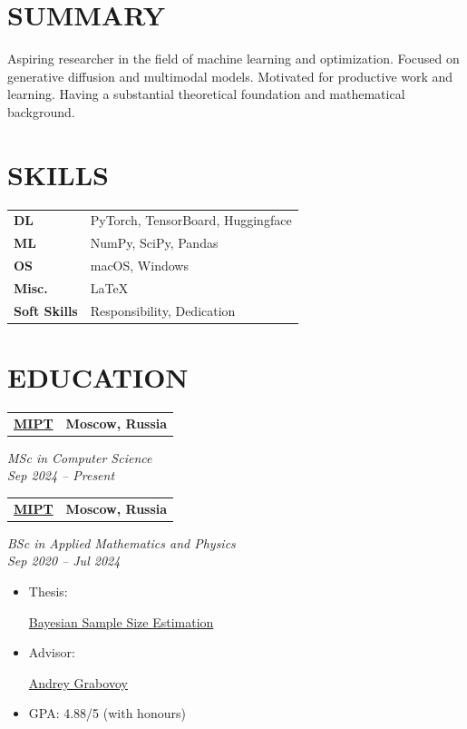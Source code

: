 \documentclass[11pt,a4paper]{moderncv}
\newcommand*{\educationentry}[4][0.5mm]{
    \begin{tabularx}{\textwidth}{LR}
        {\bfseries #3} & {\bfseries #4} \\
    \end{tabularx}
    {\itshape #2}
    \par\addvspace{#1}
}
\newcommand*{\scoreentry}[3][2.5mm]{
    {\bfseries #2} \\
    {\itshape #3}
    \par\addvspace{#1}
}
\begin{document}
\begin{minipage}[t]{0.35\textwidth}

\section{SUMMARY}
Aspiring researcher in the field of machine learning and optimization.  Focused on generative diffusion and multimodal models. Motivated for productive work and learning. Having a substantial theoretical foundation and mathematical background.

\section{SKILLS}
\begin{tabularx}{\textwidth}{>{\bfseries}l@{\hskip 3.5mm}L}
DL & PyTorch, TensorBoard, Huggingface \\
ML & NumPy, SciPy, Pandas \\
OS & macOS, Windows \\
Misc. & \LaTeX \\
Soft Skills & Responsibility, Dedication
\end{tabularx}

\section{EDUCATION}

\educationentry{MSc in Computer Science\\Sep 2024 -- Present}{\href{https://mipt.ru}{MIPT}}{Moscow, Russia}

\educationentry{BSc in Applied Mathematics and Physics\\Sep 2020 -- Jul 2024}{\href{https://mipt.ru}{MIPT}}{Moscow, Russia}
\begin{itemize}
\item Thesis: \par \href{https://github.com/intsystems/Kiselev-BS-Thesis}{Bayesian Sample Size Estimation}
\item Advisor: \par \href{https://andriygav.github.io}{Andrey Grabovoy}
\item GPA: 4.88/5 (with honours)
\end{itemize}



\end{minipage}
\end{document}
